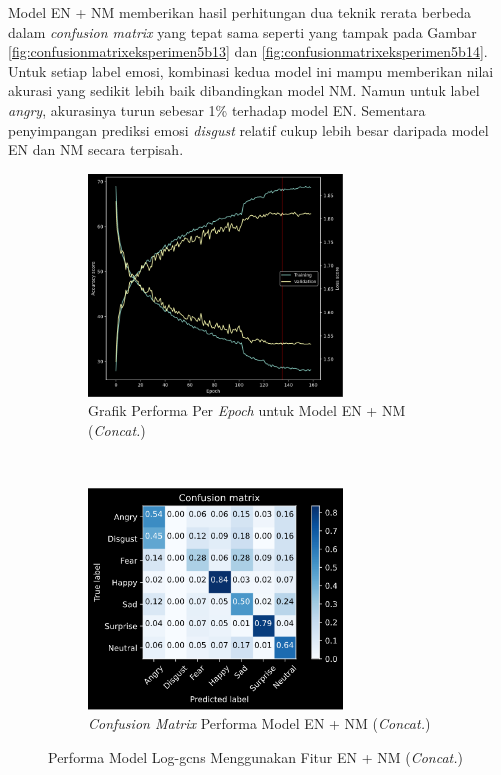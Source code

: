 Model EN + NM memberikan hasil perhitungan dua teknik rerata berbeda dalam \textit{confusion matrix} yang tepat sama seperti yang tampak pada Gambar \ref{fig:confusionmatrixeksperimen5b13} dan \ref{fig:confusionmatrixeksperimen5b14}. Untuk setiap label emosi, kombinasi kedua model ini mampu memberikan nilai akurasi yang sedikit lebih baik dibandingkan model NM. Namun untuk label \textit{angry}, akurasinya turun sebesar 1\% terhadap model EN. Sementara penyimpangan prediksi emosi \textit{disgust} relatif cukup lebih besar daripada model EN dan NM secara terpisah.

\begin{figure}[!t]
    \centering
    \begin{subfigure}[t]{6.75cm}
        \includegraphics[width=6.75cm]{gambar/eksperimen5b2_grafik1.png}
        \caption{Grafik Performa Per \textit{Epoch} untuk Model EN + NM (\textit{Concat.})}
        \label{fig:grafikeksperimen5b2}
    \end{subfigure}
    ~~~
    \begin{subfigure}[t]{6.75cm}
        \includegraphics[width=6.75cm]{gambar/eksperimen5b2_matriks1.png}
        \caption{\textit{Confusion Matrix} Performa Model EN + NM (\textit{Concat.})}
        \label{fig:confusionmatrixeksperimen5b2}
    \end{subfigure}
    \caption{Performa Model Log-\acrshort{gcns} Menggunakan Fitur EN + NM (\textit{Concat.})}
    \label{fig:hasileksperimen5b2}
\end{figure}
